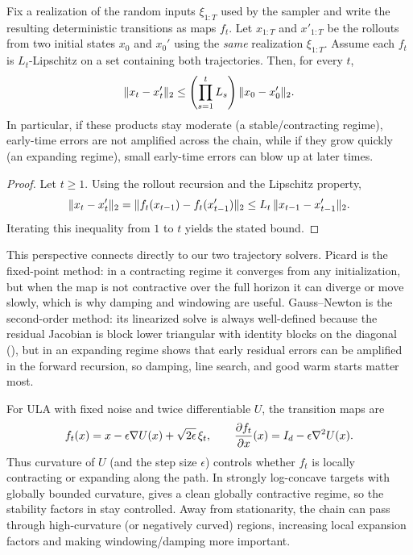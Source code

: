 \documentclass[11pt]{article}
\begin{document}
\begin{proposition}
\label{prop:away-from-stationarity-stability}
Fix a realization of the random inputs $\xi_{1:T}$ used by the sampler and write the resulting deterministic transitions as maps $f_t$.
Let $x_{1:T}$ and $x'_{1:T}$ be the rollouts from two initial states $x_0$ and $x_0'$ using the \emph{same} realization $\xi_{1:T}$.
Assume each $f_t$ is $L_t$-Lipschitz on a set containing both trajectories.
Then, for every $t$,
\[
\lVert x_t-x'_t\rVert_2 \le \left(\prod_{s=1}^t L_s\right)\lVert x_0-x_0'\rVert_2.
\]
In particular, if these products stay moderate (a stable/contracting regime), early-time errors are not amplified across the chain, while if they grow quickly (an expanding regime), small early-time errors can blow up at later times.%
\end{proposition}
\begin{proof}
Let $t\ge 1$.
Using the rollout recursion and the Lipschitz property,
\[
\lVert x_t-x'_t\rVert_2
=\lVert f_t(x_{t-1})-f_t(x'_{t-1})\rVert_2
\le L_t\,\lVert x_{t-1}-x'_{t-1}\rVert_2.
\]
Iterating this inequality from $1$ to $t$ yields the stated bound.%
\end{proof}

This perspective connects directly to our two trajectory solvers.
Picard is the fixed-point method: in a contracting regime it converges from any initialization, but when the map is not contractive over the full horizon it can diverge or move slowly, which is why damping and windowing are useful.
Gauss--Newton is the second-order method: its linearized solve is always well-defined because the residual Jacobian is block lower triangular with identity blocks on the diagonal (), but in an expanding regime  shows that early residual errors can be amplified in the forward recursion, so damping, line search, and good warm starts matter most.

For ULA with fixed noise and twice differentiable $U$, the transition maps are
\[
f_t(x)=x-\epsilon\nabla U(x)+\sqrt{2\epsilon}\,\xi_t,
\qquad
\frac{\partial f_t}{\partial x}(x)=I_d-\epsilon \nabla^2 U(x).
\]
Thus curvature of $U$ (and the step size $\epsilon$) controls whether $f_t$ is locally contracting or expanding along the path.
In strongly log-concave targets with globally bounded curvature,  gives a clean globally contractive regime, so the stability factors in  stay controlled.
Away from stationarity, the chain can pass through high-curvature (or negatively curved) regions, increasing local expansion factors and making windowing/damping more important.%
\end{document}
